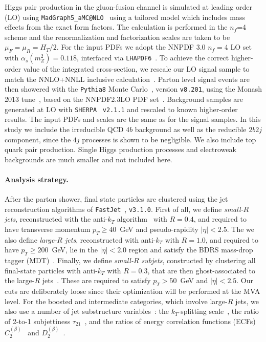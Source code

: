 \documentclass[a4paper,10pt]{article}
\begin{document}
Higgs pair production in the gluon-fusion
channel is simulated at leading order (LO) using
{\tt MadGraph5\_aMC@NLO}~\cite{Alwall:2014hca,Maltoni:2014eza}
using a tailored  model
which includes mass effects
from the
exact form factors.
%
The calculation is performed in the
$n_f$=4 scheme and
the renormalization and factorization
scales are taken to be $\mu_F=\mu_R=H_T/2$.
%
For the input PDFs we 
adopt the NNPDF 3.0 $n_f=4$ LO set~\cite{Ball:2014uwa} with
$\alpha_s(m_Z^2)=0.118$,
interfaced via {\tt LHAPDF6}~\cite{Buckley:2014ana}.
%
To achieve the correct higher-order value of the
integrated cross-section, we rescale our LO signal sample to match the
NNLO+NNLL
inclusive calculation~\cite{deFlorian:2013jea,deFlorian:2015moa}.
%
Parton level signal events are then showered with the {\tt Pythia8} Monte
Carlo~\cite{Sjostrand:2007gs,Sjostrand:2014zea}, version {\tt v8.201},
using the  Monash 2013 tune~\cite{Skands:2014pea},
based on the NNPDF2.3LO PDF set~\cite{Ball:2012cx,Ball:2013hta}.
%
Background samples are generated at LO
with {\tt SHERPA}~\cite{Gleisberg:2008ta} {\tt v2.1.1}
and rescaled to known higher-order results.
%
The input PDFs and scales are the same as for
the signal samples.
%
In this study we include the irreducible QCD $4b$ background
as well as the reducible $2b2j$ component, since the $4j$ processes
is shown to be negligible.
%
We also include top quark pair
production.
%
Single Higgs production processes and electroweak backgrounds
are much smaller and not included here.
%


\paragraph{Analysis strategy.}
After the parton shower, final state particles
are clustered using the
jet reconstruction algorithms
of
{\tt FastJet}~\cite{Cacciari:2011ma,Cacciari:2005hq},
{\tt v3.1.0}.
%
First of all, we define {\it small-$R$ jets}, reconstructed with the
anti-$k_T$ algorithm~\cite{Cacciari:2008gp} with $R=0.4$,
and  required
  to have transverse momentum $p_T \ge 40$~GeV
  and pseudo-rapidity $|\eta|<2.5$.
  The we also define {\it large-$R$ jets},  reconstructed with 
  anti-$k_T$ with $R=1.0$, and
   required to have
  $p_T \ge 200$~GeV, lie in the
  $|\eta|<2.0$ region and
   satisfy the  BDRS mass-drop tagger (MDT)~\cite{Butterworth:2008iy}.
   Finally, we define
  {\it small-$R$ subjets}, constructed  
  by clustering all final-state particles with
 anti-$k_T$ with  $R=0.3$, that are then
 ghost-associated  to the large-$R$ jets~\cite{Aad:2015uka}.
 These
  are required to satisfy
  $p_T > 50$~GeV and $|\eta|<2.5$.
  Our cuts are deliberately loose since their optimization will be
  performed at the MVA level.
%
For the   boosted and intermediate categories,
which involve large-$R$ jets,
we also use a number of jet substructure variables~\cite{Salam:2009jx,Aad:2013gja}:
the $k_T$-splitting scale~\cite{Butterworth:2002tt,Butterworth:2008iy}, the ratio of 2-to-1 subjettiness $\tau_{21}$~\cite{Thaler:2010tr,Thaler:2011gf}, and the ratios of energy correlation functions (ECFs)  $C^{(\beta)}_2$~\cite{Larkoski:2013eya} and
$D_2^{(\beta)}$~\cite{Larkoski:2014gra}.
\end{document}
